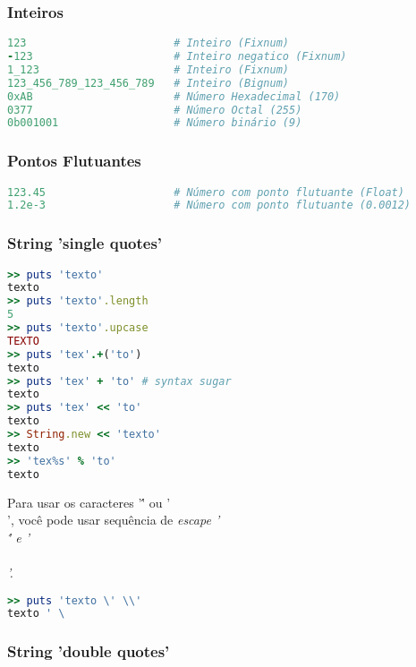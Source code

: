 \documentclass[serif,mathserif]{article}
\begin{document}
\subsubsection{Inteiros}

\begin{lstlisting}[language=ruby]
123                       # Inteiro (Fixnum)
-123                      # Inteiro negatico (Fixnum)
1_123                     # Inteiro (Fixnum)
123_456_789_123_456_789   # Inteiro (Bignum)
0xAB                      # Número Hexadecimal (170)
0377                      # Número Octal (255)
0b001001                  # Número binário (9)
\end{lstlisting}

\subsubsection{Pontos Flutuantes}

\begin{lstlisting}[language=ruby]
123.45                    # Número com ponto flutuante (Float)
1.2e-3                    # Número com ponto flutuante (0.0012)
\end{lstlisting}

\subsubsection{String 'single quotes'}

\begin{lstlisting}[language=ruby]
>> puts 'texto'
texto
>> puts 'texto'.length
5
>> puts 'texto'.upcase
TEXTO
>> puts 'tex'.+('to')
texto
>> puts 'tex' + 'to' # syntax sugar
texto
>> puts 'tex' << 'to'
texto
>> String.new << 'texto'
texto
>> 'tex%s' % 'to'
texto
\end{lstlisting}

Para usar os caracteres '\'' ou '\\', você pode usar sequência de \em{escape}  '\\\'' e '\\\\'.

\begin{lstlisting}[language=ruby]
>> puts 'texto \' \\'
texto ' \
\end{lstlisting}

\subsubsection{String 'double quotes'}
\end{document}
